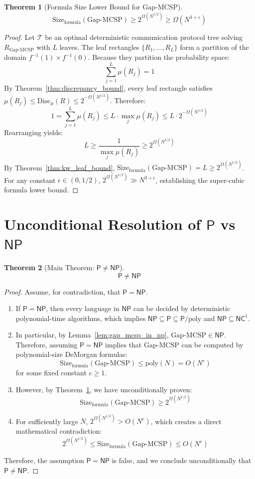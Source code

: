 \documentclass[11pt,letterpaper]{article}
\newtheorem{theorem}{Theorem}[section]
\newcommand{\NP}{\mathsf{NP}}
\renewcommand{\P}{\mathsf{P}}
\newcommand{\NC}{\mathsf{NC}}
\newcommand{\GapMCSP}{\mathrm{Gap\text{-}MCSP}}
\newcommand{\Disc}{\mathrm{Disc}}
\newcommand{\Size}{\mathrm{Size}}
\newcommand{\poly}{\mathrm{poly}}
\newcommand{\eps}{\epsilon}
\begin{document}
\begin{theorem}[Formula Size Lower Bound for $\GapMCSP$]
\label{thm:formula_lower_bound}
\[
\Size_{\text{formula}}(\GapMCSP) \ge 2^{\Omega(N^{1/2})} \ge \Omega(N^{3+\eps})
\]
\end{theorem}

\begin{proof}
Let $\mathcal{T}$ be an optimal deterministic communication protocol tree solving $R_{\GapMCSP}$ with $L$ leaves. 
The leaf rectangles $\{R_1, \dots, R_L\}$ form a partition of the domain $f^{-1}(1) \times f^{-1}(0)$. 
Because they partition the probability space:
\[
\sum_{j=1}^L \mu(R_j) = 1
\]
By Theorem~\ref{thm:discrepancy_bound}, every leaf rectangle satisfies $\mu(R_j) \le \Disc_\mu(R) \le 2^{-\Omega(N^{1/2})}$.
Therefore:
\[
1 = \sum_{j=1}^L \mu(R_j) \le L \cdot \max_j \mu(R_j) \le L \cdot 2^{-\Omega(N^{1/2})}
\]
Rearranging yields:
\[
L \ge \frac{1}{\max_j \mu(R_j)} \ge 2^{\Omega(N^{1/2})}
\]
By Theorem~\ref{thm:kw_leaf_bound}, $\Size_{\text{formula}}(\GapMCSP) = L \ge 2^{\Omega(N^{1/2})}$. 
For any constant $\eps \in (0, 1/2)$, $2^{\Omega(N^{1/2})} \gg N^{3+\eps}$, establishing the super-cubic formula lower bound.
\end{proof}

\section{Unconditional Resolution of $\P$ vs $\NP$}

\begin{theorem}[Main Theorem: $\P \neq \NP$]
\label{thm:main_p_vs_np}
\[
\P \neq \NP
\]
\end{theorem}

\begin{proof}
Assume, for contradiction, that $\P = \NP$.
\begin{enumerate}
    \item If $\P = \NP$, then every language in $\NP$ can be decided by deterministic polynomial-time algorithms, which implies $\NP \subseteq \P \subseteq \P/\poly$ and $\NP \subseteq \NC^1$.
    \item In particular, by Lemma~\ref{lem:gap_mcsp_in_np}, $\GapMCSP \in \NP$. Therefore, assuming $\P = \NP$ implies that $\GapMCSP$ can be computed by polynomial-size DeMorgan formulas:
    \[
    \Size_{\text{formula}}(\GapMCSP) \le \poly(N) = O(N^c)
    \]
    for some fixed constant $c \ge 1$.
    \item However, by Theorem~\ref{thm:formula_lower_bound}, we have unconditionally proven:
    \[
    \Size_{\text{formula}}(\GapMCSP) \ge 2^{\Omega(N^{1/2})}
    \]
    \item For sufficiently large $N$, $2^{\Omega(N^{1/2})} > O(N^c)$, which creates a direct mathematical contradiction:
    \[
    2^{\Omega(N^{1/2})} \le \Size_{\text{formula}}(\GapMCSP) \le O(N^c)
    \]
\end{enumerate}
Therefore, the assumption $\P = \NP$ is false, and we conclude unconditionally that $\P \neq \NP$.
\end{proof}
\end{document}
